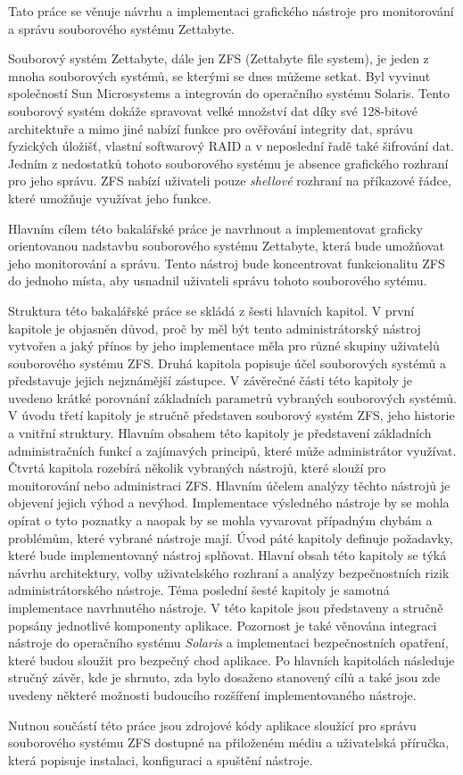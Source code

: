 Tato práce se věnuje návrhu a implementaci grafického nástroje pro monitorování a správu souborového systému Zettabyte.

Souborový systém Zettabyte, dále jen ZFS (Zettabyte file system), je jeden z mnoha souborových systémů, se kterými se dnes můžeme setkat.
Byl vyvinut společností Sun Microsystems a integrován do operačního systému Solaris. Tento souborový systém dokáže spravovat velké množství dat
díky své 128-bitové architektuře a mimo jiné nabízí funkce pro ověřování integrity dat, správu fyzických úložišť, vlastní softwarový RAID a v neposlední
řadě také šifrování dat. Jedním z nedostatků tohoto souborového systému je absence grafického rozhraní pro jeho správu. ZFS nabízí uživateli pouze \emph{shellové} rozhraní na příkazové řádce, které umožňuje využívat jeho funkce. 

Hlavním cílem této bakalářské práce je navrhnout a implementovat graficky orientovanou nadstavbu souborového systému Zettabyte, která bude umožňovat jeho monitorování a správu. Tento nástroj bude koncentrovat funkcionalitu ZFS do jednoho místa, aby usnadnil uživateli správu tohoto souborového sytému.

Struktura této bakalářské práce se skládá z šesti hlavních kapitol. 
V první kapitole je objasněn důvod, proč by měl být tento administrátorský nástroj vytvořen a jaký přínos by jeho implementace měla pro různé skupiny uživatelů souborového systému ZFS.
Druhá kapitola popisuje účel souborových systémů a představuje jejich nejznámější zástupce. V závěrečné části této kapitoly je uvedeno krátké porovnání základních parametrů vybraných souborových systémů.
V úvodu třetí kapitoly je stručně představen souborový systém ZFS, jeho historie a vnitřní struktury. Hlavním obsahem této kapitoly je představení základních administračních funkcí a zajímavých principů, které může administrátor využívat.
Čtvrtá kapitola rozebírá několik vybraných nástrojů, které slouží pro monitorování nebo administraci ZFS. Hlavním účelem analýzy těchto nástrojů je objevení jejich výhod a nevýhod. Implementace výsledného nástroje by se mohla opírat o tyto poznatky a naopak by se mohla vyvarovat případným chybám a problémům, které vybrané nástroje mají.
Úvod páté kapitoly definuje požadavky, které bude implementovaný nástroj splňovat. Hlavní obsah této kapitoly se týká návrhu architektury, volby uživatelského rozhraní a analýzy bezpečnostních rizik administrátorského nástroje.
Téma poslední šesté kapitoly je samotná implementace navrhnutého nástroje. V této kapitole jsou představeny a stručně popsány jednotlivé komponenty aplikace. Pozornost je také věnována integraci nástroje do operačního systému \emph{Solaris} a implementaci bezpečnostních opatření, které budou sloužit pro bezpečný chod aplikace.
Po hlavních kapitolách následuje stručný závěr, kde je shrnuto, zda bylo dosaženo stanovený cílů a také jsou zde uvedeny některé možnosti budoucího rozšíření implementovaného nástroje.

Nutnou součástí této práce jsou zdrojové kódy aplikace sloužící pro správu souborového systému ZFS dostupné na přiloženém médiu a uživatelská příručka, která popisuje instalaci, konfiguraci a spuštění nástroje.



